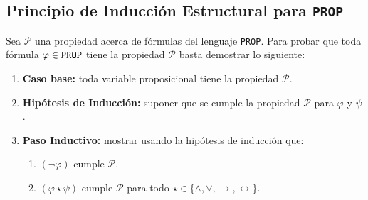 \documentclass[a4paper]{article}
\begin{document}
\subsection{Principio de Inducción Estructural para \texttt{PROP}}
\noindent
Sea \(\mathcal{P}\) una propiedad acerca de fórmulas del lenguaje \texttt{PROP}. Para probar que toda fórmula 
\(\varphi \in \text{\texttt{PROP}}\) tiene la propiedad \(\mathcal{P}\) basta demostrar lo siguiente:
\begin{enumerate}
    \item \textbf{Caso base: }toda variable proposicional tiene la propiedad \(\mathcal{P}\).
    \item \textbf{Hipótesis de Inducción: } suponer que se cumple la propiedad \(\mathcal{P}\) para \(\varphi\) y \(\psi\).
    \item \textbf{Paso Inductivo: } mostrar usando la hipótesis de inducción que:
    \begin{enumerate}
        \item \(\left(\neg \varphi\right)\) cumple \(\mathcal{P}\).
        \item \(\left(\varphi \star \psi\right)\) cumple \(\mathcal{P}\) para todo \(\star \in \{\land, \lor, \rightarrow, \leftrightarrow\}\).
    \end{enumerate}
\end{enumerate}
\end{document}
